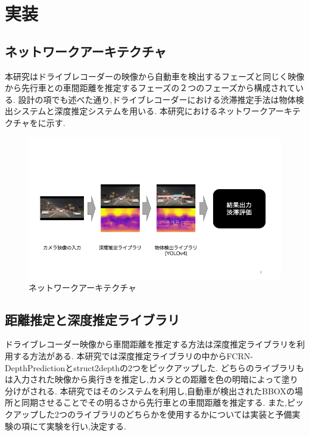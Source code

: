 \newpage
\section{実装}
\subsection{ネットワークアーキテクチャ}
本研究はドライブレコーダーの映像から自動車を検出するフェーズと同じく映像から先行車との車間距離を推定するフェーズの２つのフェーズから構成されている.
設計の項でも述べた通り,ドライブレコーダーにおける渋滞推定手法は物体検出システムと深度推定システムを用いる.
本研究におけるネットワークアーキテクチャをに示す.

\begin{figure}[htbp]
  \begin{center}
    \includegraphics[width=15cm]{figs/system_net.png}
    \caption{ネットワークアーキテクチャ}
    \label{fig:system_arch}
  \end{center}
\end{figure}



\subsection{距離推定と深度推定ライブラリ}
ドライブレコーダー映像から車間距離を推定する方法は深度推定ライブラリを利用する方法がある.
本研究では深度推定ライブラリの中からFCRN-DepthPrediction\cite{laina2016deeper}とstruct2depth\cite{casser2019struct2depth}の2つをピックアップした.
どちらのライブラリもは入力された映像から奥行きを推定し,カメラとの距離を色の明暗によって塗り分けがされる.
本研究ではそのシステムを利用し,自動車が検出されたBBOXの場所と同期させることでその明るさから先行車との車間距離を推定する.
また,ピックアップした2つのライブラリのどちらかを使用するかについては実装と予備実験の項にて実験を行い,決定する.

